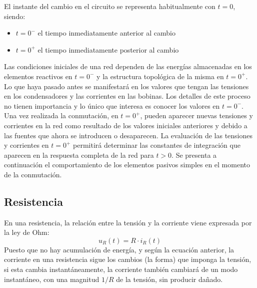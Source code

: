 El instante del cambio en el circuito se representa habitualmente con
$t = 0$, siendo:
\begin{itemize}
\item $t = 0^-$ el tiempo inmediatamente anterior al cambio
\item $t = 0^+$ el tiempo inmediatamente posterior al cambio
\end{itemize}
Las condiciones iniciales de una red dependen de las energías
almacenadas en los elementos reactivos en $t=0^-$ y la estructura
topológica de la misma en $t=0^+$. Lo que haya pasado antes se
manifestará en los valores que tengan las tensiones en los
condensadores y las corrientes en las bobinas. Los detalles de este
proceso no tienen importancia y lo único que interesa es conocer los
valores en $t=0^-$. Una vez realizada la conmutación, en $t=0^+$,
pueden aparecer nuevas tensiones y corrientes en la red como resultado
de los valores iniciales anteriores y debido a las fuentes que ahora
se introducen o desaparecen. La evaluación de las tensiones y
corrientes en $t=0^+$ permitirá determinar las constantes de
integración que aparecen en la respuesta completa de la red para
$t>0$. Se presenta a continuación el comportamiento de los elementos
pasivos simples en el momento de la conmutación.
	
\subsection{Resistencia}
En una resistencia, la relación entre la tensión y la corriente viene
expresada por la ley de Ohm:
\begin{equation*}
  u_R(t)=R\cdot i_R(t)
\end{equation*}
Puesto que no hay acumulación de energía, y según la ecuación
anterior, la corriente en una resistencia sigue los cambios (la forma)
que imponga la tensión, si esta cambia instantáneamente, la corriente
también cambiará de un modo instantáneo, con una magnitud $1/R$ de la
tensión, sin producir dañado.
	
